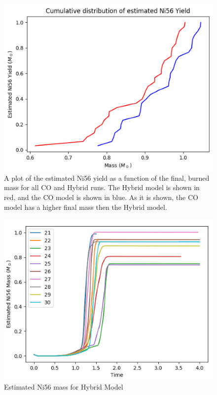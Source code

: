 \documentclass[iop,apj]{emulateapj}
\begin{document}
\begin{figure}
\includegraphics[width=\columnwidth]{figures/ni56_yield_cum_dist.png}
\caption{\label{fig:cumdist}
A plot of the estimated Ni56 yield as a function of the final, burned mass
for all CO and Hybrid runs. The Hybrid model is shown in red, and the CO
model is shown in blue. As it is shown, the CO model has a higher final mass
then the Hybrid model. 
}
\end{figure}

\begin{figure}
\includegraphics[width=\columnwidth]{figures/ni56_vs_time_hybrid.png}
\caption{\label{fig:nithybrid}
Estimated Ni56 mass for Hybrid Model
}
\end{figure}
\end{document}
